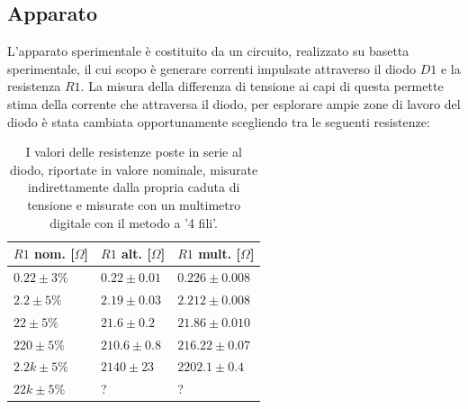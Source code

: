 \documentclass{article}[a4paper, oneside, 11pt]
\begin{document}
\subsection{Apparato}
L'apparato sperimentale è costituito da un circuito, realizzato su basetta 
sperimentale, il cui scopo è generare correnti impulsate attraverso il diodo 
$D1$ e la resistenza $R1$. La misura della differenza di tensione ai capi di questa 
permette stima della corrente che attraversa il diodo, per esplorare ampie zone 
di lavoro del diodo è stata cambiata opportunamente scegliendo tra le seguenti 
resistenze:\\
\begin{table}[!htb]
    \begin{center}
	\begin{tabular}{lll}
	    \toprule
	    $R1$ nom. [$\Omega$] & $R1$ alt. [$\Omega$] & $R1$ mult. [$\Omega$] \\ 
	    \midrule
	    \midrule
	    $0.22 \pm 3 \% $         & $0.22 \pm 0.01$          & $0.226 \pm 0.008$ \\
	    $2.2 \pm 5 \% $          & $2.19 \pm 0.03$          & $2.212 \pm 0.008$ \\
	    $22 \pm 5 \% $           & $21.6 \pm 0.2$           & $21.86 \pm 0.010$ \\ 
	    $220 \pm 5 \% $          & $210.6 \pm 0.8$          & $216.22 \pm 0.07$ \\
	    $2.2 k \pm 5 \% $        & $2140 \pm 23$        & $2202.1 \pm 0.4$ \\
	    $22 k \pm 5 \% $         & ?                        & ?      \\     
	    \bottomrule
	\end{tabular}
	\caption{I valori delle resistenze poste in serie al diodo, riportate in
		valore nominale, misurate indirettamente dalla propria caduta di
		tensione e misurate con un multimetro digitale con il metodo a
		'4 fili'. \label{tab: res}}
    \end{center}
\end{table}
\end{document}
